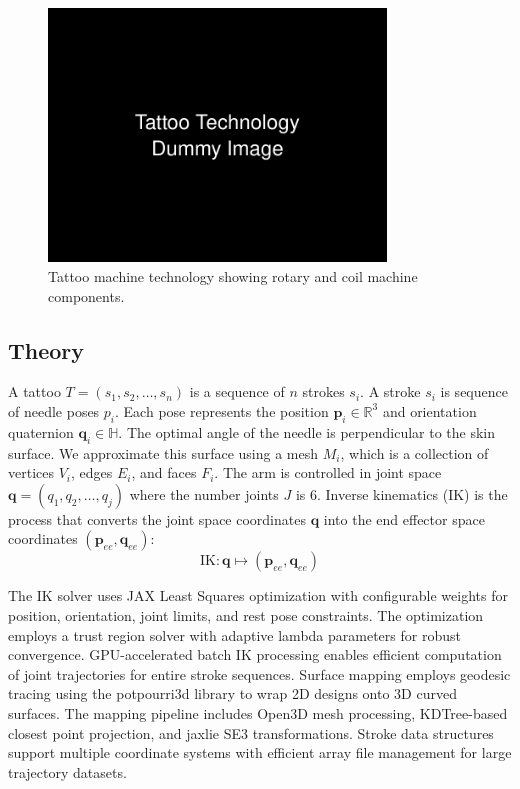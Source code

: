 \documentclass[11pt]{article}
\begin{document}
\begin{figure}[h]
    \centering
    \includegraphics[width=0.8\textwidth]{figures/technology.png}
    \caption{Tattoo machine technology showing rotary and coil machine components.}
    \label{fig:technology}
\end{figure}

\subsection{Theory}

A tattoo $T = (s_1, s_2, \ldots, s_n)$ is a sequence of $n$ strokes $s_i$.
A stroke $s_i$ is sequence of needle poses $p_i$.
Each pose represents the position $\mathbf{p}_i \in \mathbb{R}^3$ and orientation quaternion $\mathbf{q}_i \in \mathbb{H}$.
The optimal angle of the needle is perpendicular to the skin surface.
We approximate this surface using a mesh $M_i$, which is a collection of vertices $V_i$, edges $E_i$, and faces $F_i$.
The arm is controlled in joint space $\mathbf{q} = (q_1, q_2, \ldots, q_j)$ where the number joints $J$ is $6$.
Inverse kinematics (IK) is the process that converts the joint space coordinates \( \mathbf{q} \) into the end effector space coordinates \( (\mathbf{p}_{ee}, \mathbf{q}_{ee}) \):
\[
\text{IK}: \mathbf{q} \mapsto (\mathbf{p}_{ee}, \mathbf{q}_{ee})
\]

The IK solver uses JAX Least Squares optimization with configurable weights for position, orientation, joint limits, and rest pose constraints.
The optimization employs a trust region solver with adaptive lambda parameters for robust convergence.
GPU-accelerated batch IK processing enables efficient computation of joint trajectories for entire stroke sequences.
Surface mapping employs geodesic tracing using the potpourri3d library to wrap 2D designs onto 3D curved surfaces.
The mapping pipeline includes Open3D mesh processing, KDTree-based closest point projection, and jaxlie SE3 transformations.
Stroke data structures support multiple coordinate systems with efficient array file management for large trajectory datasets.
\end{document}
